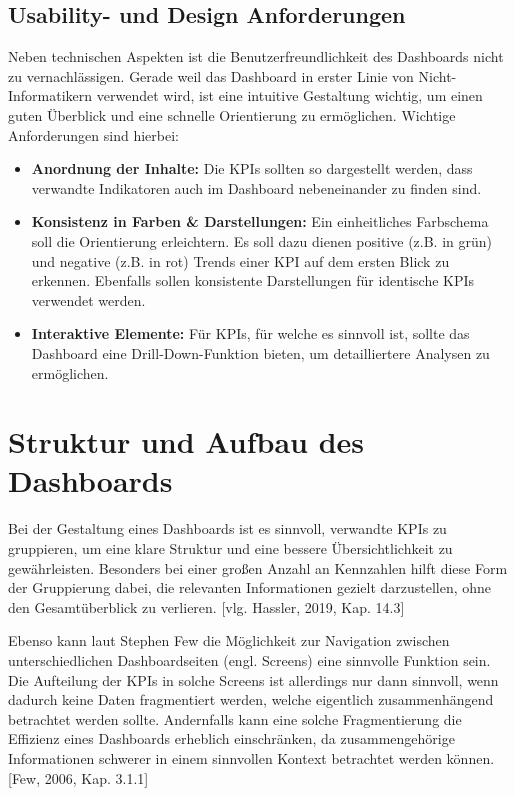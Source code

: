 \subsection{Usability- und Design Anforderungen}
Neben technischen Aspekten ist die Benutzerfreundlichkeit des Dashboards nicht zu vernachlässigen. Gerade weil das Dashboard in erster Linie von Nicht-Informatikern verwendet wird, ist eine intuitive Gestaltung wichtig, um einen guten Überblick und eine schnelle Orientierung zu ermöglichen. Wichtige Anforderungen sind hierbei:
\begin{itemize}
    \item \textbf{Anordnung der Inhalte:} Die KPIs sollten so dargestellt werden, dass verwandte Indikatoren auch im Dashboard nebeneinander zu finden sind.
    \item \textbf{Konsistenz in Farben \& Darstellungen:} Ein einheitliches Farbschema soll die Orientierung erleichtern. Es soll dazu dienen positive (z.B. in grün) und negative (z.B. in rot) Trends einer KPI auf dem ersten Blick zu erkennen. Ebenfalls sollen konsistente Darstellungen für identische KPIs verwendet werden.
    \item \textbf{Interaktive Elemente:} Für KPIs, für welche es sinnvoll ist, sollte das Dashboard eine Drill-Down-Funktion bieten, um detailliertere Analysen zu ermöglichen.
\end{itemize}

\section{Struktur und Aufbau des Dashboards}
Bei der Gestaltung eines Dashboards ist es sinnvoll, verwandte KPIs zu gruppieren, um eine klare Struktur und eine bessere Übersichtlichkeit zu gewährleisten. Besonders bei einer großen Anzahl an Kennzahlen hilft diese Form der Gruppierung dabei, die relevanten Informationen gezielt darzustellen, ohne den Gesamtüberblick zu verlieren. [vlg. Hassler, 2019, Kap. 14.3]

Ebenso kann laut Stephen Few die Möglichkeit zur Navigation zwischen unterschiedlichen Dashboardseiten (engl. Screens) eine sinnvolle Funktion sein. Die Aufteilung der KPIs in solche Screens ist allerdings nur dann sinnvoll, wenn dadurch keine Daten fragmentiert werden, welche eigentlich zusammenhängend betrachtet werden sollte. Andernfalls kann eine solche Fragmentierung die Effizienz eines Dashboards erheblich einschränken, da zusammengehörige Informationen schwerer in einem sinnvollen Kontext betrachtet werden können. [Few, 2006, Kap. 3.1.1]


